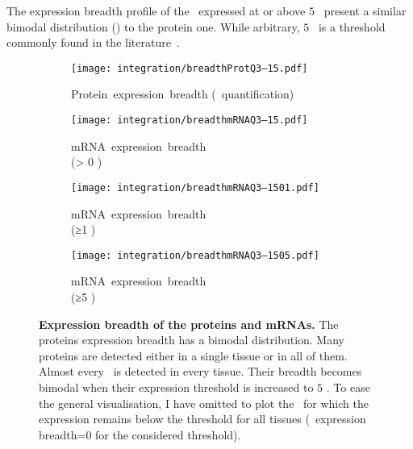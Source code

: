 The expression breadth profile of the \mRNAs\ expressed at or above $5$ \FPKM\
present a similar bimodal distribution () to the protein one.
While arbitrary, $5$ \FPKM\ is a threshold commonly found
in the literature~.\\
\vspace{-\baselineskip}

\begin{figure}[!htb]
    \begin{subfigure}[h]{0.53\textwidth}
    \captionsetup{margin=0.6cm,justification=centering}
        \centering \texttt{[image: integration/breadthProtQ3--15.pdf]}
        \caption{Protein~expression~breadth (\PPKM~quantification)}\label{fig:protBreadth}
    \end{subfigure}
    \begin{subfigure}[h]{0.53\textwidth}
    \captionsetup{margin=0.6cm,justification=centering}
        \centering \texttt{[image: integration/breadthmRNAQ3--15.pdf]}
        \caption{mRNA~expression~breadth\\(> 0 \FPKM)}\label{fig:mRNAbreadth0}
    \end{subfigure}
    \vspace{2.5mm}

    \begin{subfigure}[b]{0.53\textwidth}
    \captionsetup{margin=0.6cm,justification=centering}
        \centering \texttt{[image: integration/breadthmRNAQ3--1501.pdf]}
        \caption{mRNA~expression~breadth\\(≥1 \FPKM)}\label{fig:mRNAbreadth1}
    \end{subfigure}
    \begin{subfigure}[b]{0.53\textwidth}
    \captionsetup{margin=0.6cm,justification=centering}
        \centering \texttt{[image: integration/breadthmRNAQ3--1505.pdf]}
        \caption{mRNA~expression~breadth\\(≥5 \FPKM)}\label{fig:mRNAbreadth5}
    \end{subfigure}
    \vspace{-5mm}
    \caption[Expression breadth of the proteins and mRNAs]{\label{fig:expressionBreadth}%
    \textbf{Expression breadth of the proteins and mRNAs.}
    The proteins expression breadth has a bimodal distribution.
    Many proteins are detected either in a single tissue or in all of them.
    Almost every \mRNA\ is detected in every tissue.
    Their breadth becomes bimodal when their expression threshold
    is increased to $5$ \FPKM{}.
    To ease the general visualisation,
    I have omitted to plot the \mRNAs\
    for which the expression remains below the threshold for all tissues
    (\ie\ expression breadth=0 for the considered threshold).
    }
\end{figure}

